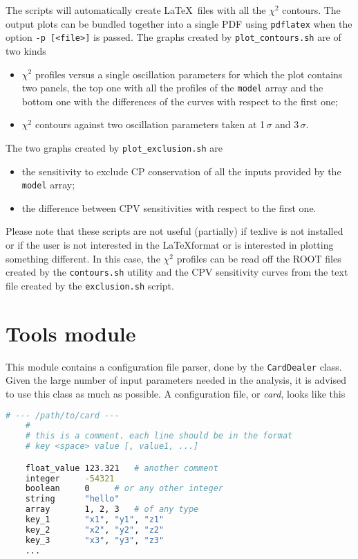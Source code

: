 \documentclass[a4paper, 11pt]{article}
\begin{document}
The scripts will automatically create \LaTeX\ files with all the $\chi^2$ contours. 
The output plots can be bundled together into a single PDF using \texttt{pdflatex} %
when the option \texttt{-p [<file>]} is passed.
The graphs created by \texttt{plot\_contours.sh} are of two kinds
\begin{itemize}
	\item $\chi^2$ profiles versus a single oscillation parameters for which the plot %
		contains two panels, the top one with all the profiles of the \texttt{model} array %
		and the bottom one with the differences of the curves with respect to the first one;
	\item $\chi^2$ contours against two oscillation parameters taken at 1\,$\sigma$ and 3\,$\sigma$.
\end{itemize}
The two graphs created by \texttt{plot\_exclusion.sh} are
\begin{itemize}
	\item the sensitivity to exclude CP conservation of all the inputs provided by %
		the \texttt{model} array;
	\item the difference between CPV sensitivities with respect to the first one.
\end{itemize}

Please note that these scripts are not useful (partially) if texlive is not installed or %
if the user is not interested in the \LaTeX format or is interested in plotting something different.
In this case, the $\chi^2$ profiles can be read off the ROOT files created by the \texttt{contours.sh} %
utility and the CPV sensitivity curves from the text file created by the \texttt{exclusion.sh} script.


\section{Tools module}
\label{sec:tools}

This module contains a configuration file parser, done by the \texttt{CardDealer} class.
Given the large number of input parameters needed in the analysis, it is advised to use this class as much as possible.
A configuration file, or \emph{card}, looks like this
\begin{lstlisting}[language=bash]
	# --- /path/to/card ---
	#
	# this is a comment. each line should be in the format
	# key <space> value [, value1, ...]

	float_value	123.321	  # another comment
	integer		-54321
	boolean		0	  # or any other integer
	string		"hello"
	array		1, 2, 3	  # of any type
	key_1		"x1", "y1", "z1"
	key_2		"x2", "y2", "z2"
	key_3		"x3", "y3", "z3"
	...
\end{lstlisting}
\end{document}
